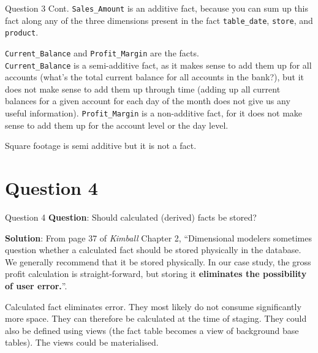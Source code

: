 \begin{frame}[fragile]{Question 3 Cont.}
\texttt{Sales\_Amount} is an additive fact, because you can sum up this fact along any of the three dimensions present in the fact \texttt{table\_date}, \texttt{store}, and \texttt{product}.\\\vspace{5pt}

\texttt{Current\_Balance} and \texttt{Profit\_Margin} are the facts.\\\vspace{5pt} \texttt{Current\_Balance} is a semi-additive fact, as it
makes sense to add them up for all accounts (what's the total current balance for all accounts in the bank?), but it does not make sense to add them up through time (adding up all current balances for a given account for each day of the month does not give us any useful information). \texttt{Profit\_Margin} is a non-additive fact, for it does not make sense to add them up for the account level or the day level.\\\vspace{5pt}

Square footage is semi additive but it is not a fact.
\end{frame}

\section*{Question 4}

\begin{frame}[fragile]{Question 4}
	\textbf{Question}: Should calculated (derived) facts be stored?\\\vspace{10pt}
	
	\textbf{Solution}: From page 37 of \textit{Kimball} Chapter 2, ``Dimensional modelers sometimes question whether a calculated fact should be stored physically in the database. We generally recommend that it be stored physically. In our case study, the gross profit calculation is straight-forward, but storing it \textbf{eliminates	the possibility of user error.}''. \\\vspace{5pt}
	
	Calculated fact eliminates error. They most likely do not consume
	significantly more space. They can therefore be calculated at the time of staging. They could also be defined using views (the fact table becomes a view of background base tables). The views could be materialised.
\end{frame}

